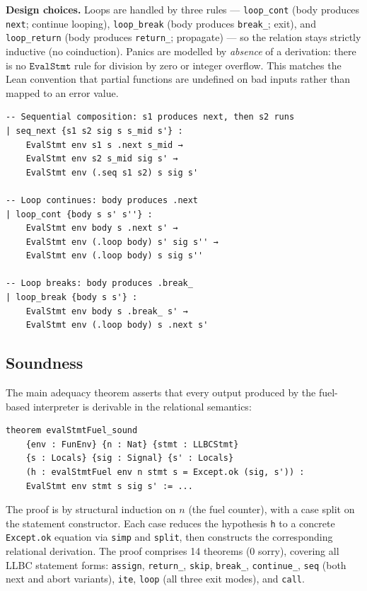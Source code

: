 \noindent
\textbf{Design choices.}
Loops are handled by three rules — \texttt{loop\_cont} (body produces
\texttt{next}; continue looping), \texttt{loop\_break} (body produces
\texttt{break\_}; exit), and \texttt{loop\_return} (body produces
\texttt{return\_}; propagate) — so the relation stays strictly inductive
(no coinduction).
Panics are modelled by \emph{absence} of a derivation: there is no
$\texttt{EvalStmt}$ rule for division by zero or integer overflow.
This matches the Lean convention that partial functions are undefined
on bad inputs rather than mapped to an error value.

\begin{lstlisting}[caption={Selected \texttt{EvalStmt} rules (Lean notation).},
                   label={lst:evalstmt}]
-- Sequential composition: s1 produces next, then s2 runs
| seq_next {s1 s2 sig s s_mid s'} :
    EvalStmt env s1 s .next s_mid →
    EvalStmt env s2 s_mid sig s' →
    EvalStmt env (.seq s1 s2) s sig s'

-- Loop continues: body produces .next
| loop_cont {body s s' s''} :
    EvalStmt env body s .next s' →
    EvalStmt env (.loop body) s' sig s'' →
    EvalStmt env (.loop body) s sig s''

-- Loop breaks: body produces .break_
| loop_break {body s s'} :
    EvalStmt env body s .break_ s' →
    EvalStmt env (.loop body) s .next s'
\end{lstlisting}

\subsection{Soundness}

The main adequacy theorem asserts that every output produced by the
fuel-based interpreter is derivable in the relational semantics:

\begin{lstlisting}[caption={Soundness of the LLBC interpreter.},
                   label={lst:soundness}]
theorem evalStmtFuel_sound
    {env : FunEnv} {n : Nat} {stmt : LLBCStmt}
    {s : Locals} {sig : Signal} {s' : Locals}
    (h : evalStmtFuel env n stmt s = Except.ok (sig, s')) :
    EvalStmt env stmt s sig s' := ...
\end{lstlisting}

\noindent
The proof is by structural induction on $n$ (the fuel counter), with a
case split on the statement constructor.
Each case reduces the hypothesis \texttt{h} to a concrete
\texttt{Except.ok} equation via \texttt{simp} and \texttt{split},
then constructs the corresponding relational derivation.
The proof comprises 14 theorems (0 sorry), covering all LLBC statement forms:
\texttt{assign}, \texttt{return\_}, \texttt{skip}, \texttt{break\_},
\texttt{continue\_}, \texttt{seq} (both next and abort variants),
\texttt{ite}, \texttt{loop} (all three exit modes), and \texttt{call}.

